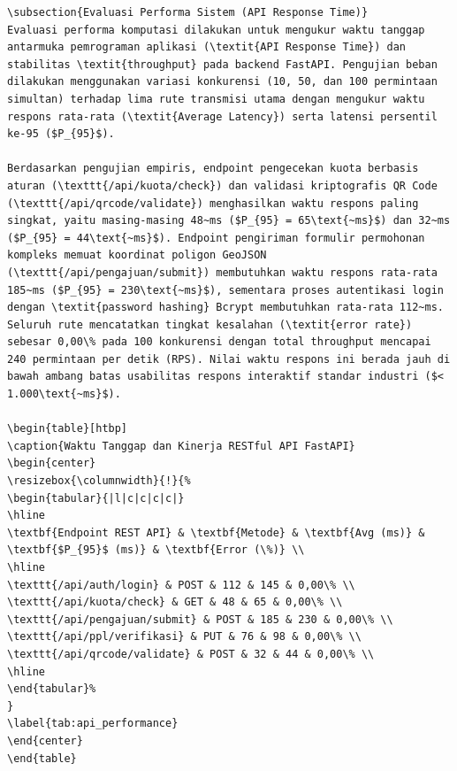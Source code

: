 \documentclass[conference]{IEEEtran}
\begin{document}
\begin{lstlisting}
\subsection{Evaluasi Performa Sistem (API Response Time)}
Evaluasi performa komputasi dilakukan untuk mengukur waktu tanggap antarmuka pemrograman aplikasi (\textit{API Response Time}) dan stabilitas \textit{throughput} pada backend FastAPI. Pengujian beban dilakukan menggunakan variasi konkurensi (10, 50, dan 100 permintaan simultan) terhadap lima rute transmisi utama dengan mengukur waktu respons rata-rata (\textit{Average Latency}) serta latensi persentil ke-95 ($P_{95}$).

Berdasarkan pengujian empiris, endpoint pengecekan kuota berbasis aturan (\texttt{/api/kuota/check}) dan validasi kriptografis QR Code (\texttt{/api/qrcode/validate}) menghasilkan waktu respons paling singkat, yaitu masing-masing 48~ms ($P_{95} = 65\text{~ms}$) dan 32~ms ($P_{95} = 44\text{~ms}$). Endpoint pengiriman formulir permohonan kompleks memuat koordinat poligon GeoJSON (\texttt{/api/pengajuan/submit}) membutuhkan waktu respons rata-rata 185~ms ($P_{95} = 230\text{~ms}$), sementara proses autentikasi login dengan \textit{password hashing} Bcrypt membutuhkan rata-rata 112~ms. Seluruh rute mencatatkan tingkat kesalahan (\textit{error rate}) sebesar 0,00\% pada 100 konkurensi dengan total throughput mencapai 240 permintaan per detik (RPS). Nilai waktu respons ini berada jauh di bawah ambang batas usabilitas respons interaktif standar industri ($< 1.000\text{~ms}$).

\begin{table}[htbp]
\caption{Waktu Tanggap dan Kinerja RESTful API FastAPI}
\begin{center}
\resizebox{\columnwidth}{!}{%
\begin{tabular}{|l|c|c|c|c|}
\hline
\textbf{Endpoint REST API} & \textbf{Metode} & \textbf{Avg (ms)} & \textbf{$P_{95}$ (ms)} & \textbf{Error (\%)} \\
\hline
\texttt{/api/auth/login} & POST & 112 & 145 & 0,00\% \\
\texttt{/api/kuota/check} & GET & 48 & 65 & 0,00\% \\
\texttt{/api/pengajuan/submit} & POST & 185 & 230 & 0,00\% \\
\texttt{/api/ppl/verifikasi} & PUT & 76 & 98 & 0,00\% \\
\texttt{/api/qrcode/validate} & POST & 32 & 44 & 0,00\% \\
\hline
\end{tabular}%
}
\label{tab:api_performance}
\end{center}
\end{table}


\end{lstlisting}
\end{document}
